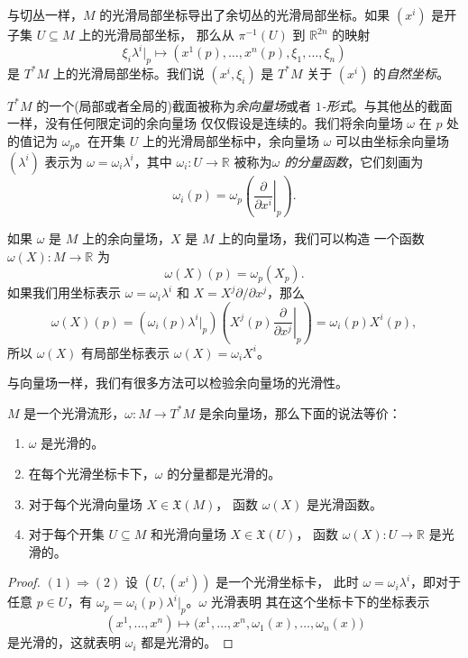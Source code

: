 \documentclass[fontset=none]{Notes}
\begin{document}
与切丛一样，$M$ 的光滑局部坐标导出了余切丛的光滑局部坐标。如果 
$\left(x^i\right)$ 是开子集 $U\subseteq M$ 上的光滑局部坐标，
那么从 $\pi^{-1}(U)$ 到 $\mathbb{R}^{2n}$ 的映射
\[
  \xi_i\lambda^i|_p \mapsto 
  \left(x^1(p),\dots,x^n(p),\xi_1,\dots,\xi_n\right)
\]
是 $T^*M$ 上的光滑局部坐标。我们说 $\left(x^i,\xi_i\right)$ 是
$T^*M$ 关于 $\left(x^i\right)$ 的\emph{自然坐标}。

$T^*M$ 的一个(局部或者全局的)截面被称为\emph{余向量场}或者
\emph{$1$-形式}。与其他丛的截面一样，没有任何限定词的余向量场
仅仅假设是连续的。我们将余向量场 $\omega$ 在 $p$ 处的值记为
$\omega_p$。在开集 $U$ 上的光滑局部坐标中，余向量场 $\omega$
可以由坐标余向量场 $\left(\lambda^i\right)$ 表示为
$\omega=\omega_i\lambda^i$，其中 $\omega_i:U\to \mathbb{R}$
被称为\emph{$\omega$ 的分量函数}，它们刻画为
\[
  \omega_i(p)=\omega_p\left(\left.\frac{\partial}{\partial x^i}\right|_p\right).  
\]

如果 $\omega$ 是 $M$ 上的余向量场，$X$ 是 $M$ 上的向量场，我们可以构造
一个函数 $\omega(X):M\to \mathbb{R}$ 为
\[
  \omega(X)(p)=\omega_p(X_p).  
\]
如果我们用坐标表示 $\omega=\omega_i\lambda^i$ 和 $X=X^j\partial/\partial x^j$，那么
\[
  \omega(X)(p)=\left(\omega_i(p)\lambda^i|_p\right) 
  \left(X^j(p)\left.\frac{\partial}{\partial x^j}\right|_p\right)
  =\omega_i(p)X^i(p),
\]
所以 $\omega(X)$ 有局部坐标表示 $\omega(X)=\omega_iX^i$。

与向量场一样，我们有很多方法可以检验余向量场的光滑性。

\begin{proposition}[余向量场的光滑性判别]
  $M$ 是一个光滑流形，$\omega:M\to T^*M$ 是余向量场，那么下面的说法等价：
  \begin{enumerate}
    \item $\omega$ 是光滑的。
    \item 在每个光滑坐标卡下，$\omega$ 的分量都是光滑的。
    \item 对于每个光滑向量场 $X\in \mathfrak{X}(M)$，
    函数 $\omega(X)$ 是光滑函数。
    \item 对于每个开集 $U\subseteq M$ 和光滑向量场 $X\in \mathfrak{X}(U)$，
    函数 $\omega(X):U\to \mathbb{R}$ 是光滑的。
  \end{enumerate}
\end{proposition}
\begin{proof}
  $(1)\Rightarrow (2)$ 设 $(U,(x^i))$ 是一个光滑坐标卡，
  此时 $\omega=\omega_i\lambda^i$，即对于任意 $p\in U$，有
  $\omega_p=\omega_i(p)\lambda^i|_p$。$\omega$ 光滑表明
  其在这个坐标卡下的坐标表示
  \[
    (x^1,\dots,x^n)\mapsto \bigl(x^1,\dots,x^n,\omega_1(x),\dots,\omega_n(x)\bigr)
  \]
  是光滑的，这就表明 $\omega_i$ 都是光滑的。
\end{proof}
\end{document}
